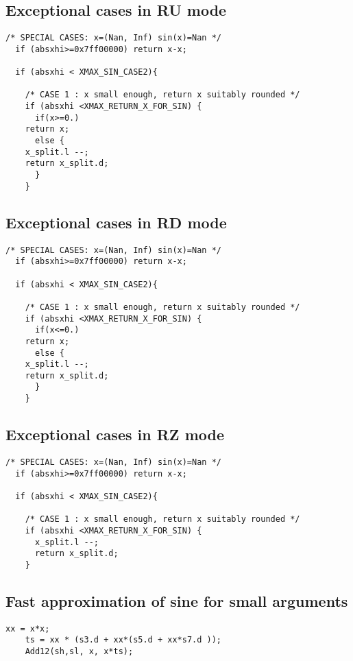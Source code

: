 \subsection{Exceptional cases in RU mode}
\begin{lstlisting}[caption={Exceptional cases for sine RU},firstnumber=1]
  /* SPECIAL CASES: x=(Nan, Inf) sin(x)=Nan */
  if (absxhi>=0x7ff00000) return x-x;    
  
  if (absxhi < XMAX_SIN_CASE2){

    /* CASE 1 : x small enough, return x suitably rounded */
    if (absxhi <XMAX_RETURN_X_FOR_SIN) {
      if(x>=0.)
	return x;
      else {
	x_split.l --;
	return x_split.d;
      }
    }
\end{lstlisting}
\subsection{Exceptional cases in RD mode}
\begin{lstlisting}[caption={Exceptional cases for sine RD},firstnumber=1]
  /* SPECIAL CASES: x=(Nan, Inf) sin(x)=Nan */
  if (absxhi>=0x7ff00000) return x-x;    
  
  if (absxhi < XMAX_SIN_CASE2){

    /* CASE 1 : x small enough, return x suitably rounded */
    if (absxhi <XMAX_RETURN_X_FOR_SIN) {
      if(x<=0.)
	return x;
      else {
	x_split.l --;
	return x_split.d;
      }
    }
\end{lstlisting}
\subsection{Exceptional cases in RZ mode}
\begin{lstlisting}[caption={Exceptional cases for sine RZ},firstnumber=1]
  /* SPECIAL CASES: x=(Nan, Inf) sin(x)=Nan */
  if (absxhi>=0x7ff00000) return x-x;    
  
  if (absxhi < XMAX_SIN_CASE2){

    /* CASE 1 : x small enough, return x suitably rounded */
    if (absxhi <XMAX_RETURN_X_FOR_SIN) {
      x_split.l --;
      return x_split.d;
    }
\end{lstlisting}


\subsection{Fast approximation of sine for small arguments \label{sec:trigo:fastsine}}

\begin{lstlisting}[caption={Sine, case 2},firstnumber=1]
    xx = x*x;
    ts = xx * (s3.d + xx*(s5.d + xx*s7.d ));
    Add12(sh,sl, x, x*ts);
\end{lstlisting}

